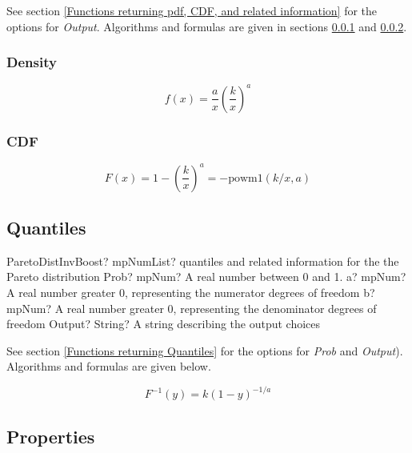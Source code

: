 \vspace{0.3cm}
See section \ref{Functions returning pdf, CDF, and related information} for the options for {\itshape\sffamily Output}. Algorithms and formulas are given in sections \ref{ParetoDistributionDensity} and \ref{ParetoDistributionCDF}.

\subsubsection{Density}
\label{ParetoDistributionDensity}

\begin{equation} 
	f(x)= \frac{a}{x} \left(\frac{k}{x}\right)^a
\end{equation}


\subsubsection{CDF}
\label{ParetoDistributionCDF}

\vspace{0.3cm}
\begin{equation} 
	F(x)= 1 - \left(\frac{k}{x}\right)^a = - \text{powm1}(k/x,a)
\end{equation}



\subsection{Quantiles}
\begin{mpFunctionsExtract}
	\mpFunctionFourNotImplemented
	{ParetoDistInvBoost? mpNumList? quantiles and related information for the the Pareto distribution}
	{Prob? mpNum? A real number between 0 and 1.}
	{a? mpNum? A real number greater 0, representing the numerator  degrees of freedom}
	{b? mpNum? A real number greater 0, representing the denominator degrees of freedom}
	{Output? String? A string describing the output choices}
\end{mpFunctionsExtract}

See section \ref{Functions returning Quantiles} for the options for  {\itshape\sffamily Prob} and {\itshape\sffamily Output}). Algorithms and formulas are given below.

\begin{equation} 
	F^{-1}(y)= k(1-y)^{-1/a}
\end{equation}



\subsection{Properties}
\label{ParetoDistributionProperties}

